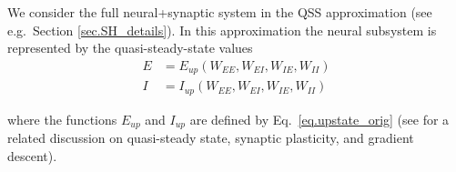 \documentclass[twocolumn]{article}
\newcommand{\EE}{\mathit{EE}}
\newcommand{\EI}{\mathit{EI}}
\newcommand{\IE}{\mathit{IE}}
\newcommand{\II}{\mathit{II}}
\newcommand{\up}{\mathit{up}}
\begin{document}
We consider the full neural+synaptic system in the QSS approximation (see e.g.\ Section \ref{sec.SH_details}). In this approximation the neural subsystem is represented by the quasi-steady-state values
\begin{equation}
\begin{aligned}
E & = E_{\up}(W_{\EE},W_{\EI},W_{\IE},W_{\II}) \\
I & = I_{\up}(W_{\EE},W_{\EI},W_{\IE},W_{\II})
\label{eq.LF_EIup}
\end{aligned}
\end{equation}

\noindent where the functions $E_{\up}$ and $I_{\up}$ are defined by Eq.\ \ref{eq.upstate_orig} (see \cite{Mackwood2020} for a related discussion on quasi-steady state, synaptic plasticity, and gradient descent).
\end{document}
